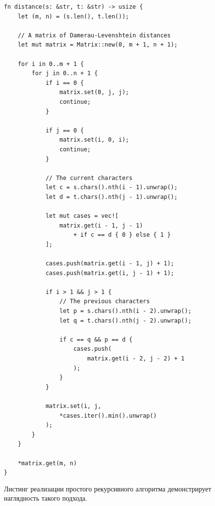 \documentclass{report}
\begin{document}
\begin{lstlisting}[caption=Реализация нерекурсивного алгоритма]
fn distance(s: &str, t: &str) -> usize {
    let (m, n) = (s.len(), t.len());

    // A matrix of Damerau-Levenshtein distances
    let mut matrix = Matrix::new(0, m + 1, n + 1);

    for i in 0..m + 1 {
        for j in 0..n + 1 {
            if i == 0 {
                matrix.set(0, j, j);
                continue;
            }

            if j == 0 {
                matrix.set(i, 0, i);
                continue;
            }

            // The current characters
            let c = s.chars().nth(i - 1).unwrap();
            let d = t.chars().nth(j - 1).unwrap();

            let mut cases = vec![
                matrix.get(i - 1, j - 1)
                    + if c == d { 0 } else { 1 }
            ];

            cases.push(matrix.get(i - 1, j) + 1);
            cases.push(matrix.get(i, j - 1) + 1);

            if i > 1 && j > 1 {
                // The previous characters
                let p = s.chars().nth(i - 2).unwrap();
                let q = t.chars().nth(j - 2).unwrap();

                if c == q && p == d {
                    cases.push(
                        matrix.get(i - 2, j - 2) + 1
                    );
                }
            }

            matrix.set(i, j,
                *cases.iter().min().unwrap()
            );
        }
    }

    *matrix.get(m, n)
}
\end{lstlisting}

Листинг реализации простого рекурсивного алгоритма демонстрирует
наглядность такого подхода.
\end{document}
